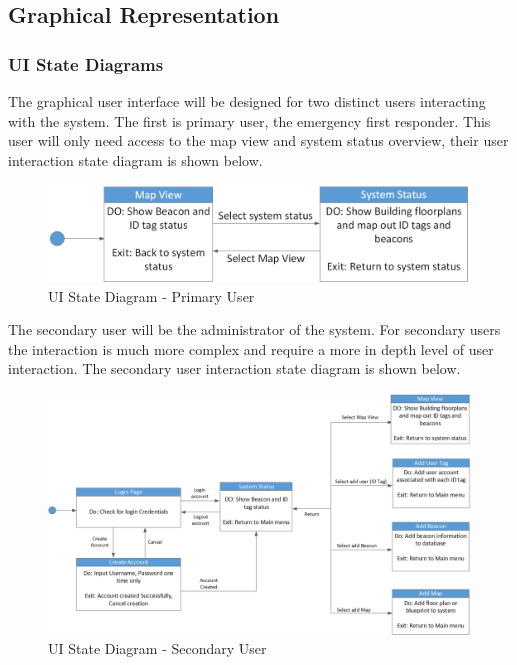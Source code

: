 

\subsection{Graphical Representation}
\bigskip

\subsubsection{UI State Diagrams}
\medskip
The graphical user interface will be designed for two distinct users interacting with the system. The first is primary user, the emergency first responder. This user will only need access to the map view and system status overview, their user interaction state diagram is shown below.

\medskip
\begin{figure}[H]
\centering
    \includegraphics[scale=0.4]{./images/UI_State_FF.png}
    \caption{UI State Diagram - Primary User}
    \label{UISD-1}
\end{figure}
\medskip

The secondary user will be the administrator of the system. For secondary users the interaction is much more complex and require a more in depth level of user interaction. The secondary user interaction state diagram is shown below.

\medskip
\begin{figure}[H]
\centering
    \includegraphics[scale=0.5]{./images/UI_State_IT.png}
    \caption{UI State Diagram - Secondary User}
    \label{UISD-2}
\end{figure}
\medskip



